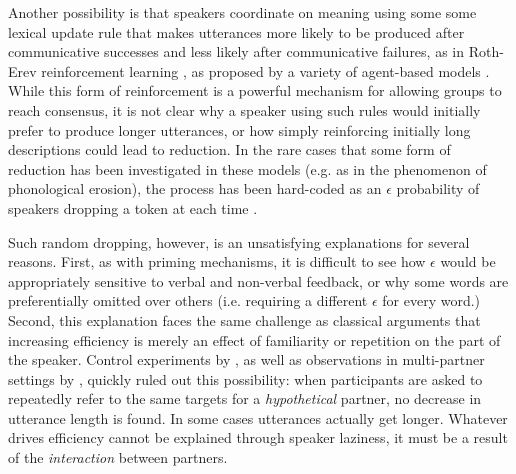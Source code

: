Another possibility is that speakers coordinate on meaning using some some lexical update rule that makes utterances more likely to be produced after communicative successes and less likely after communicative failures, as in Roth-Erev reinforcement learning \cite{erev1998predicting}, as proposed by a variety of agent-based models \cite{steels_self-organizing_1995,barr_establishing_2004,young_evolution_2015} .
While this form of reinforcement is a powerful mechanism for allowing groups to reach consensus, it is not clear why a speaker using such rules would initially prefer to produce longer utterances, or how simply reinforcing initially long descriptions could lead to reduction. 
In the rare cases that some form of reduction has been investigated in these models (e.g. as in the phenomenon of phonological erosion), the process has been hard-coded as an $\epsilon$ probability of speakers dropping a token at each time \cite{beuls2013agent,steels2016agent}.

Such random dropping, however, is an unsatisfying explanations for several reasons.
First, as with priming mechanisms, it is difficult to see how $\epsilon$ would be appropriately sensitive to verbal and non-verbal feedback, or why some words are preferentially omitted over others (i.e. requiring a different $\epsilon$ for every word.)
Second, this explanation faces the same challenge as classical arguments that increasing efficiency is merely an effect of familiarity or repetition on the part of the speaker.
Control experiments by , as well as observations in multi-partner settings by , quickly ruled out this possibility: when participants are asked to repeatedly refer to the same targets for a \emph{hypothetical} partner, no decrease in utterance length is found. 
In some cases utterances actually get longer.
Whatever drives efficiency cannot be explained through speaker laziness, it must be a result of the \emph{interaction} between partners.

